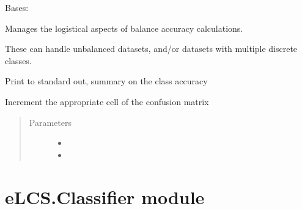 \documentclass[letterpaper,10pt,english]{sphinxmanual}
\begin{document}
\begin{fulllineitems}
\label{\detokenize{eLCS:eLCS.ClassAccuracy.ClassAccuracy}}
Bases: 

Manages the logistical aspects of balance accuracy calculations.

These can handle unbalanced datasets, and/or datasets with multiple discrete classes.

\begin{fulllineitems}
\label{\detokenize{eLCS:eLCS.ClassAccuracy.ClassAccuracy.reportClassAccuracy}}
Print to standard out, summary on the class accuracy

\end{fulllineitems}


\begin{fulllineitems}
\label{\detokenize{eLCS:eLCS.ClassAccuracy.ClassAccuracy.updateAccuracy}}
Increment the appropriate cell of the confusion matrix
\begin{quote}\begin{description}
\item[{Parameters}] \leavevmode\begin{itemize}
\item {} 
 \textendash{} 

\item {} 
 \textendash{} 

\end{itemize}

\end{description}\end{quote}

\end{fulllineitems}


\end{fulllineitems}



\section{eLCS.Classifier module}
\label{\detokenize{eLCS:module-eLCS.Classifier}}\label{\detokenize{eLCS:elcs-classifier-module}}
\end{document}
